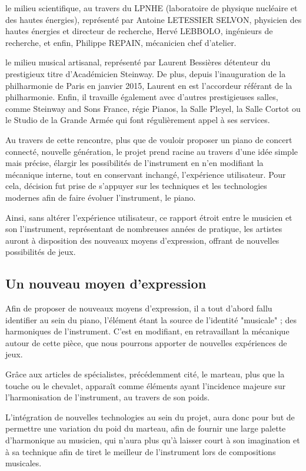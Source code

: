 \documentclass[french,a4paper,12pt]{report}
\begin{document}
	le milieu scientifique, au travers du LPNHE (laboratoire de physique nucléaire et des hautes énergies), représenté par Antoine LETESSIER SELVON, physicien des hautes énergies et directeur de recherche, Hervé LEBBOLO, ingénieurs de recherche, et enfin,  Philippe REPAIN, mécanicien chef d'atelier.
	
	le milieu musical artisanal, représenté par Laurent Bessières détenteur du prestigieux titre d'Académicien Steinway.
	De plus, depuis l'inauguration de la philharmonie de Paris en janvier 2015, Laurent en est l'accordeur référant de la philharmonie. Enfin, il travaille également avec d'autres prestigieuses salles, comme Steinway and Sons France, régie Pianos, la Salle Pleyel, la Salle Cortot ou le Studio de la Grande Armée qui font régulièrement appel à ses services.	
	
	Au travers de cette rencontre, plus que de vouloir proposer un piano de concert connecté, nouvelle génération, le projet prend racine au travers d'une idée simple mais précise, élargir les possibilités de l'instrument en n'en modifiant la mécanique interne, tout en conservant inchangé, l'expérience utilisateur.
	Pour cela, décision fut prise de s'appuyer sur les techniques et les technologies modernes afin de faire évoluer l'instrument, le piano.
	
	Ainsi, sans altérer l'expérience utilisateur, ce rapport étroit entre le musicien et son l'instrument, représentant de nombreuses années de pratique, les artistes auront à disposition des nouveaux moyens d'expression, offrant de nouvelles possibilités de jeux.
	
	\newpage
	
		\subsection{Un nouveau moyen d'expression}
		
		Afin de proposer de nouveaux moyens d'expression, il a tout d'abord fallu identifier au sein du piano, l'élément étant la source de l'identité "musicale" ; des harmoniques de l'instrument. C'est en modifiant, en retravaillant la mécanique autour de cette pièce, que nous pourrons apporter de nouvelles expériences de jeux.
		
		Grâce aux articles de spécialistes, précédemment cité, le marteau, plus que la touche ou le chevalet, apparaît comme éléments ayant l'incidence majeure sur l'harmonisation de l'instrument, au travers de son poids.
		
		L'intégration de nouvelles technologies au sein du projet, aura donc pour but de permettre une variation du poid du marteau, afin de fournir une large palette d'harmonique au musicien, qui n'aura plus qu'à laisser court à son imagination et à sa technique afin de tiret le meilleur de l'instrument lors de compositions musicales.
	
\end{document}
